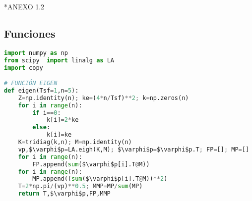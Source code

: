 *ANEXO 1.2

\subsection*{Funciones}
{}

\begin{MyFont}
\begin{adjustwidth}{4.8mm}{}
\begin{lstlisting}[language=Python, caption={\footnotesize Funciones-KS}, mathescape=true,label={Algoritmo2}]
import numpy as np
from scipy  import linalg as LA
import copy

# FUNCIÓN EIGEN
def eigen(Tsf=1,n=5):
    Z=np.identity(n); ke=(4*n/Tsf)**2; k=np.zeros(n)
    for i in range(n):
        if i==0:
            k[i]=2*ke
        else:
            k[i]=ke
    K=tridiag(k,n); M=np.identity(n)
    vp,$\varphi$p=LA.eigh(K,M); $\varphi$p=$\varphi$p.T; FP=[]; MP=[] 
    for i in range(n):
        FP.append(sum($\varphi$p[i].T@M))
    for i in range(n):
        MP.append((sum($\varphi$p[i].T@M))**2)
    T=2*np.pi/(vp)**0.5; MMP=MP/sum(MP)
    return T,$\varphi$p,FP,MMP

\end{lstlisting}
\end{adjustwidth}
\end{MyFont}

